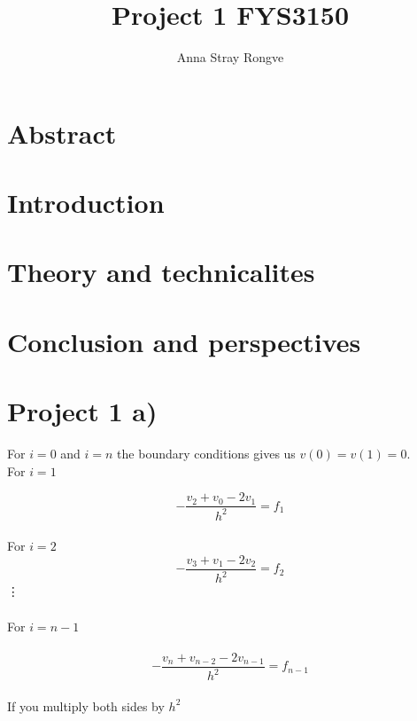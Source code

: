 \documentclass{article}
\title{Project 1 FYS3150}\vspace{-3ex}
\author{Anna Stray Rongve}
\date{\vspace{-5ex}}
\begin{document}
\maketitle
\section*{Abstract}
\maketitle
\section*{Introduction}
\maketitle
\section*{Theory and technicalites}
\maketitle
\section*{Conclusion and perspectives}

\maketitle
\section*{Project 1 a)}

For $i = 0$ and $i = n$ the boundary conditions gives us $v(0) = v(1) = 0$.
\\
For $i = 1$

\begin{equation}
   -\frac{v_2+v_0-2v_1}{h^2} = f_1
\end{equation}
\\
For $i = 2$\\
\begin{equation}
   -\frac{v_3+v_1-2v_2}{h^2}{} = f_2
\end{equation}
\vdots\\
\\
For  $i = n-1$\\
\\
\begin{equation}
  -\frac{v_n+v_{n-2}-2v_{n-1}}{h^2}{} = f_{n-1}
\end{equation}\\
If you multiply both sides by $h^2$
\end{document}
